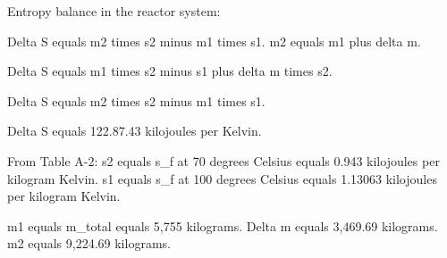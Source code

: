 Entropy balance in the reactor system:  

Delta S equals m2 times s2 minus m1 times s1.  
m2 equals m1 plus delta m.  

Delta S equals m1 times s2 minus s1 plus delta m times s2.  

Delta S equals m2 times s2 minus m1 times s1.  

Delta S equals 122.87.43 kilojoules per Kelvin.  

From Table A-2:  
s2 equals s_f at 70 degrees Celsius equals 0.943 kilojoules per kilogram Kelvin.  
s1 equals s_f at 100 degrees Celsius equals 1.13063 kilojoules per kilogram Kelvin.  

m1 equals m_total equals 5,755 kilograms.  
Delta m equals 3,469.69 kilograms.  
m2 equals 9,224.69 kilograms.